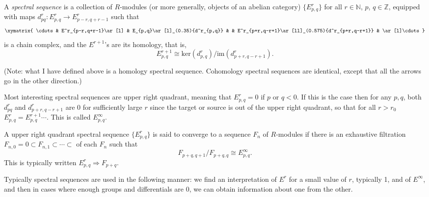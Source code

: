 \documentclass[12pt]{article}
\newcommand{\Z}{\mathbb{Z}}
\begin{document}

A \emph{spectral sequence} is a collection of $R$-modules (or more generally, objects of an abelian category) $\{E^r_{p,q}\}$ for all $r\in\mathbb{N}$, $p$, $q\in\Z$, equipped with maps $d^r_{pq}:E^r_{p,q}\to E^r_{p-r,q+r-1}$ such that 
\[\xymatrix{
\cdots & 
E^r_{p-r,q+r-1}\ar[l] & 
E_{p,q}\ar[l]_(0.35){d^r_{p,q}} & 
&
E^r_{p+r,q-r+1}\ar[ll]_(0.575){d^r_{p+r,q-r+1}} & 
\ar[l]\cdots
}\]
is a chain complex, and the $E^{r+1}$'s are its homology, that is,  
\[
E^{r+1}_{p,q}\cong \mathrm{ker}(d^r_{p,q})/\mathrm{im}({d^r_{p+r,q-r+1}}).
\]

(Note: what I have defined above is a homology spectral sequence.  Cohomology spectral sequences are identical, except that all the arrows go in the other direction.)

Most interesting spectral sequences are upper right quadrant, meaning that $E^r_{p,q}=0$ if $p$ or $q<0$.  If this is the case then for any $p,q$, both $d^r_{pq}$ and $d^r_{p+r,q-r+1}$ are 0 for sufficiently large $r$ since the target or source is out of the upper right quadrant, so that for all $r>r_0$ $E^r_{p,q}=E^{r+1}_{p,q}\cdots$.  This  is called $E^{\infty}_{p,q}$.

A upper right quadrant spectral sequence $\{E^r_{p,q}\}$ is said to converge to a sequence $F_n$ of $R$-modules if there is an exhaustive filtration $F_{n,0}=0\subset F_{n,1}\subset\cdots\subset$ of each $F_n$ such that 
\[
F_{p+q,q+1}/F_{p+q,q}\cong E^\infty_{p,q}.
\]
This is typically written $E^r_{p,q}\Rightarrow F_{p+q}$.

Typically spectral sequences are used in the following manner: we find an interpretation of $E^r$ for a small value of $r$, typically 1, and of $E^\infty$, and then in cases where enough groups and differentials are $0$, we can obtain information about one from the other.
\end{document}
